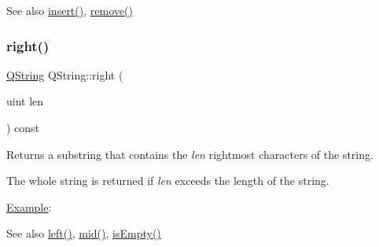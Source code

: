 \begin{DoxyCode}{0}
\end{DoxyCode}


\begin{DoxySeeAlso}{See also}
\mbox{\hyperlink{class_q_string_a3733066010481ab1e8f037bd99045269}{insert()}}, \mbox{\hyperlink{class_q_string_afd08aabf1d9b04a3fef298290af04cbd}{remove()}} 
\end{DoxySeeAlso}
\mbox{\label{class_q_string_aa77ad91688915fed22e4150b00b5fd92}} 
\subsubsection{\texorpdfstring{right()}{right()}}
{\footnotesize\ttfamily \mbox{\hyperlink{class_q_string}{Q\+String}} Q\+String\+::right (\begin{DoxyParamCaption}\item[{uint}]{len }\end{DoxyParamCaption}) const}

Returns a substring that contains the {\itshape len} rightmost characters of the string.

The whole string is returned if {\itshape len} exceeds the length of the string.

\mbox{\hyperlink{struct_example}{Example}}\+: 
\begin{DoxyCode}{0}
\end{DoxyCode}


\begin{DoxySeeAlso}{See also}
\mbox{\hyperlink{class_q_string_a02545407c8e65afbf6bd22324f9ed517}{left()}}, \mbox{\hyperlink{class_q_string_a1ef65644b1885a7003d5c2a8e88df479}{mid()}}, \mbox{\hyperlink{class_q_string_aa032d4b5892338beb575a85e59bbbf38}{is\+Empty()}} 
\end{DoxySeeAlso}
\mbox{\label{class_q_string_a77e73231263538edb5b62675471c5e78}} 
